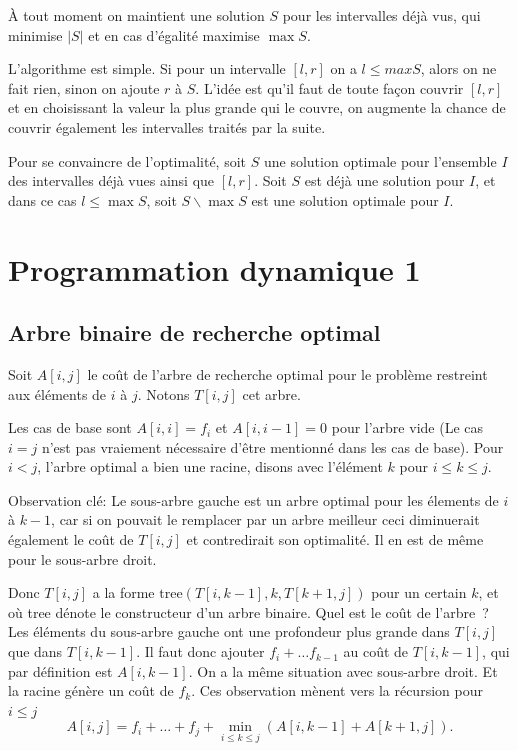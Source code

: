 \documentclass[12pt]{article}
\begin{document}
À tout moment on maintient une solution $S$ pour les intervalles déjà vus, qui minimise $|S|$ et en cas d'égalité maximise $\max S$.

L'algorithme est simple.  Si pour un intervalle $[l,r]$ on a $l\leq max S$, alors on ne fait rien, sinon on ajoute $r$ à $S$.
L'idée est qu'il faut de toute façon couvrir $[l,r]$ et en choisissant la valeur la plus grande qui le couvre, on augmente la chance de couvrir également les intervalles traités par la suite.

Pour se convaincre de l'optimalité, soit $S$ une solution optimale pour l'ensemble $I$ des intervalles déjà vues ainsi que $[l,r]$.  Soit $S$ est déjà une solution pour $I$, et dans ce cas $l\leq \max S$, soit $S\backslash \max S$ est une solution optimale pour $I$.


\section{Programmation dynamique 1}

\subsection{Arbre binaire de recherche optimal}

Soit $A[i,j]$ le coût de l'arbre de recherche optimal pour le problème restreint aux éléments de $i$ à $j$.
 Notons $T[i,j]$ cet arbre.

  Les cas de base sont $A[i,i]=f_i$ et $A[i,i-1]=0$ pour l'arbre vide (Le cas $i=j$ n'est pas vraiement nécessaire d'être mentionné dans les cas de base). 
Pour $i<j$, l'arbre optimal a bien une racine, disons avec l'élément $k$ pour $i\leq k\leq j$.  

Observation clé: Le sous-arbre gauche est un arbre optimal pour les élements de $i$ à $k-1$, car si on pouvait le remplacer par un arbre meilleur ceci diminuerait également le coût de $T[i,j]$ et contredirait son optimalité.  Il en est de même pour le sous-arbre droit.

Donc $T[i,j]$ a la forme $\textrm{tree}(T[i,k-1],k,T[k+1,j])$ pour un certain $k$, et où tree dénote le constructeur d'un arbre binaire. Quel est le coût de l'arbre~?
Les éléments du sous-arbre gauche ont une profondeur plus grande dans $T[i,j]$ que dans $T[i,k-1]$. Il faut donc ajouter $f_i + \ldots f_{k-1}$ au coût de $T[i,k-1]$, qui par définition est $A[i,k-1]$.  On a la même situation avec sous-arbre droit. Et la racine génère un coût de $f_k$.  Ces observation mènent vers la récursion pour $i \leq j$
\[
	A[i,j] = f_i + \ldots + f_j +  \min_{i\leq k\leq j} (A[i,k-1] + A[k+1,j]).
\]
\end{document}
